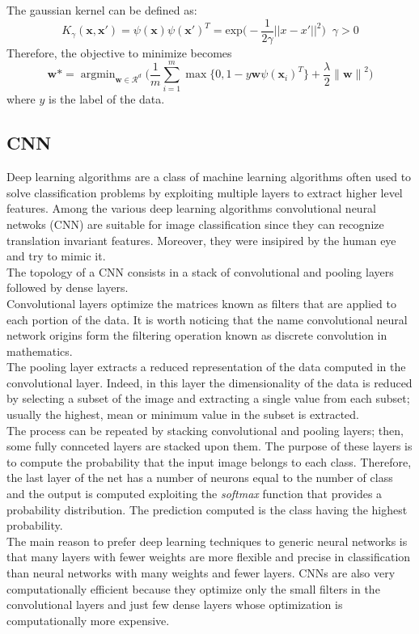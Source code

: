 \documentclass{article}
\DeclareMathOperator*{\argmin}{argmin}
\begin{document}
The gaussian kernel can be defined as:
\begin{equation}
K_{\gamma}(\textbf{x},\textbf{x}') = \psi(\textbf{x}) \psi(\textbf{x}')^T  = \text{exp} \bigg( - \frac{1}{2 \gamma} ||x - x' ||^2 \bigg) \;\; \gamma > 0
\end{equation}
Therefore, the objective to minimize becomes
\begin{equation}
      \textbf{w} \mbox{*} = \argmin_{\textbf{w} \in \mathcal{R}^d} \bigg( \frac{1}{m}\sum_{i=1}^m \max\{0,1-y\textbf{w} \psi(\textbf{x}_i)^T\} + \frac{\lambda}{2} {\lVert \textbf{w} \rVert}^2 \bigg)
\end{equation}
where $y$ is the label of the data. \cite{book1} \cite{book2}

\subsection{CNN} \label{sec:cnn}
Deep learning algorithms are a class of machine learning algorithms often used to solve classification problems by exploiting multiple layers to extract higher level features. Among the various deep learning algorithms convolutional neural netwoks (CNN) are suitable for image classification since they can recognize translation invariant features. Moreover, they were insipired by the human eye and try to mimic it. \\
The topology of a  CNN consists in a stack of convolutional and pooling layers followed by dense layers. \\
Convolutional layers optimize the matrices known as filters that are applied to each portion of the data. It is worth noticing that the name convolutional neural network origins form the filtering operation known as discrete convolution in mathematics. \\ 
The pooling layer extracts a reduced representation of the data computed in the convolutional layer. Indeed, in this layer the dimensionality of the data is reduced by selecting a subset of the image and extracting a single value from each subset; usually the highest, mean or minimum value in the subset is extracted. \\
The process can be repeated by stacking convolutional and pooling layers; then, some fully connceted layers are stacked upon them. The purpose of these layers is to compute the probability that the input image belongs to each class. Therefore, the last layer of the net has a number of neurons equal to the number of class and the output is computed exploiting the \textit{softmax} function that provides a probability distribution. The prediction computed is the class having the highest probability. \\
The main reason to prefer deep learning techniques to generic neural networks is that many layers with fewer weights are more flexible and precise in classification than neural networks with many weights and fewer layers. CNNs are also very computationally efficient because they optimize only the small filters in the convolutional layers and just few dense layers whose optimization is computationally more expensive. \\
\end{document}
